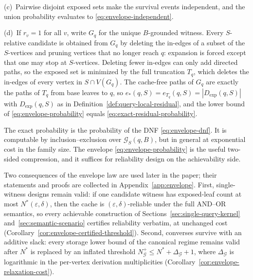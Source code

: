 \documentclass[journal]{IEEEtran}
\makeatletter
\numberwithin{equation}{section}
\renewenvironment{proof}[1][\proofname]{\par
  \pushQED{\qed}%
  \normalfont \topsep6\p@\@plus6\p@\relax
  \trivlist
  \item[\hskip\labelsep
        \itshape
    #1\@addpunct{.}]\ignorespaces
}{%
  \popQED\endtrivlist\@endpefalse
}
\makeatother
\begin{document}
\begin{proof}
(c)\ Pairwise disjoint exposed sets make the survival events independent,
and the union probability evaluates to \eqref{eq:envelope-independent}.

(d)\ If \(r_v=1\) for all \(v\), write \(G_q\) for the unique \(B\)-grounded
witness.  Every \(S\)-relative candidate is obtained from \(G_q\) by deleting
the in-edges of a subset of the \(S\)-vertices and pruning vertices that no
longer reach \(q\): expansion is forced except that one may stop at
\(S\)-vertices.  Deleting fewer in-edges can only add directed paths, so the
exposed set is minimized by the full truncation \(T_q\), which deletes the
in-edges of every vertex in \(S\cap V(G_q)\).  The cache-free paths of
\(G_q\) are exactly the paths of \(T_q\) from base leaves to \(q\), so
\(e_*(q,S)=e_{T_q}(q,S)=|D_{\mathrm{exp}}(q,S)|\) with
\(D_{\mathrm{exp}}(q,S)\) as in
Definition~\ref{def:query-local-residual}, and the lower bound of
\eqref{eq:envelope-probability} equals
\eqref{eq:exact-residual-probability}.
\end{proof}

The exact probability is the probability of the DNF
\eqref{eq:envelope-dnf}.  It is computable by inclusion--exclusion over
\(\mathcal G_S(q,B)\), but in general at exponential cost in the family size.
The envelope \eqref{eq:envelope-probability} is the useful two-sided
compression, and it suffices for reliability design on the achievability
side.

Two consequences of the envelope law are used later in the paper; their
statements and proofs are collected in Appendix~\ref{app:envelope}.  First,
single-witness designs remain valid: if one candidate witness has
exposed-leaf count at most \(N^*(\varepsilon,\delta)\), then the cache is
\((\varepsilon,\delta)\)-reliable under the full AND--OR semantics, so every
achievable construction of Sections~\ref{sec:single-query-kernel}
and~\ref{sec:semantic-scenario} certifies reliability verbatim, at unchanged
cost (Corollary~\ref{cor:envelope-certified-threshold}).  Second, converses
survive with an additive slack: every storage lower bound of the canonical
regime remains valid after \(N^*\) is replaced by an inflated threshold
\(N^+_{\mathcal G}\le N^*+\Delta_{\mathcal G}+1\), where
\(\Delta_{\mathcal G}\) is logarithmic in the per-vertex derivation
multiplicities (Corollary~\ref{cor:envelope-relaxation-cost}).

\end{document}
